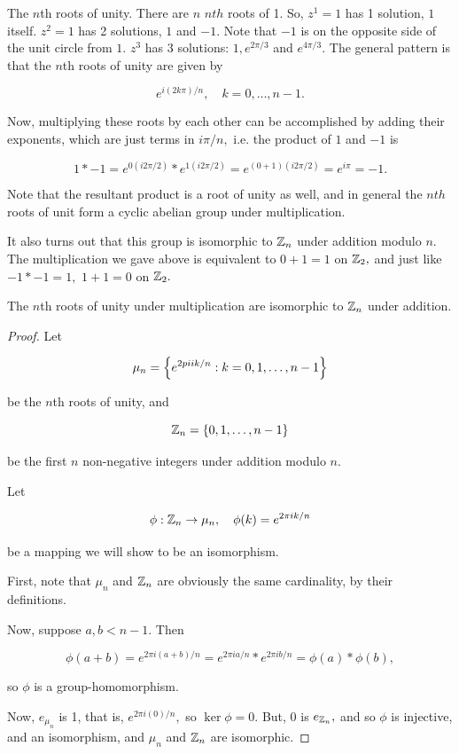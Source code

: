 \documentclass{article}
\begin{document}
The $n$th roots of \@{unity}. There are $n$ $nth$ roots of 1. So, $z^{1} = 1$ has 1 solution, $1$ itself. $z^{2} = 1$ has 2 solutions, $1$ and $-1.$ Note that $-1$ is on the opposite side of the unit circle from $1.$ $z^3$ has 3 solutions: $1, e^{2 \pi / 3}$ and $e^{4 \pi / 3}.$  The general pattern is that the $n$th roots of unity are given by

\[ e^{i(2 k \pi)/n}, \quad k = 0, \dots, n-1. \]

Now, multiplying these roots by each other can be accomplished by adding their exponents, which are just terms in $i \pi / n,$ i.e. the product of $1$ and $-1$ is

\[ 1 * -1 = e^{0(i 2 \pi /2)} * e^{1(i 2 \pi /2)} = e^{(0 + 1)(i 2 \pi / 2)} = e^{i \pi} = -1. \]

Note that the resultant product is a root of unity as well, and in general the $nth$ roots of unit form a \@{cyclic} \@{abelian} \@{group} under multiplication.

It also turns out that this \@{group} is isomorphic to $\mathbb{Z}_n$ under addition modulo $n.$ The multiplication we gave above is equivalent to $0 + 1 = 1$ on $\mathbb{Z}_2,$ and just like $-1 * -1 = 1,$ $1 + 1 = 0$ on $\mathbb{Z}_2.$

\begin{theorem}
The $n$th roots of \@{unity} under multiplication are isomorphic to $\mathbb{Z}_n$ under addition.
\end{theorem}

\begin{proof}
Let

\[ \mu_n = \left\{ e^{2 pi i k /n} : k = 0, 1, \dots, n - 1 \right\} \]

be the $n$th roots of unity, and

\[ \mathbb{Z}_n = \left\{ 0, 1, \dots, n - 1 \right\} \]

be the first $n$ non-negative \@{integers} under addition modulo $n.$

Let

\[ \phi : \mathbb{Z}_n \to \mu_n, \quad \phi(k) = e^{2 \pi i k / n} \]

be a \@{mapping} we will show to be an isomorphism.

First, note that $\mu_n$ and $\mathbb{Z}_n$ are obviously the same cardinality, by their definitions.

Now, suppose $a, b < n-1.$ Then

\[ \phi(a + b) = e^{2 \pi i (a + b) / n} = e^{2 \pi i a / n} * e^{2 \pi i b / n} = \phi(a) * \phi(b), \]

so $\phi$ is a \@{group-homomorphism}.

Now,  $e_{\mu_n}$ is 1, that is, $e^{2 \pi i (0) / n},$ so $\ker{\phi} = {0}.$ But, $0$ is $e_{\mathbb{Z}_n},$ and so $\phi$ is \@{injective}, and an \@{isomorphism}, and $\mu_n$ and $\mathbb{Z}_n$ are isomorphic.
\end{proof}
\end{document}
